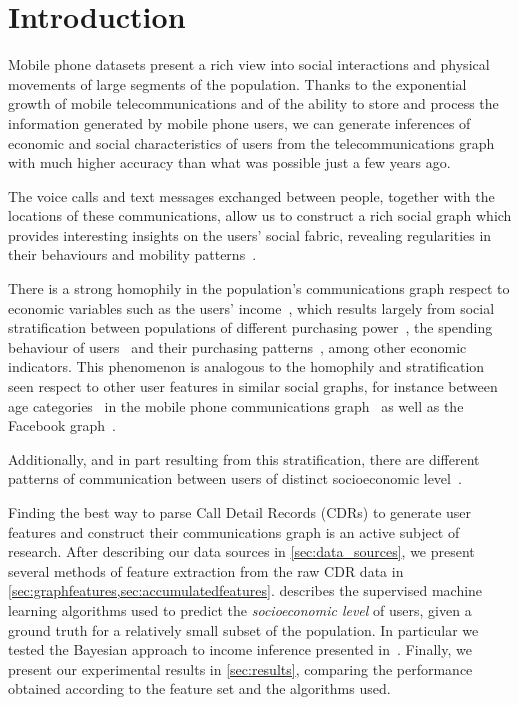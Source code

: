 
\section{Introduction}

Mobile phone datasets present a rich view into social interactions and physical movements of large segments of the population. Thanks to the exponential growth of mobile telecommunications and of the ability to store and process the information generated by mobile phone users, we can generate inferences of economic and social characteristics of users from the telecommunications graph with much higher accuracy than what was possible just a few years ago.

The voice calls and text messages exchanged between people, together with the locations of these communications, allow us to construct a rich social graph which provides interesting insights on the users' social fabric, revealing regularities in their behaviours and mobility patterns~\cite{gonzalez2008understanding,ponieman2013human,sarraute2015city}.

There is a strong homophily in the population's communications graph respect to economic variables such as the users' income~\cite{fixmanasonam2016}, which results largely from social stratification between populations of different purchasing power~\cite{leo2015socioeconomic}, the spending behaviour of users~\cite{singh2013predicting} and their purchasing patterns~\cite{Leo2016correlations}, among other economic indicators.
This phenomenon is analogous to the homophily and stratification seen respect to other user features in similar social graphs, for instance between age categories~\cite{mcpherson2001birds} in the mobile phone communications graph~\cite{sarraute2014} as well as the Facebook graph~\cite{ugander2011anatomy}.

Additionally, and in part resulting from this stratification, there are different patterns of communication between users of distinct socioeconomic level~\cite{Luo2017inferring}.

Finding the best way to parse Call Detail Records (CDRs) to generate user features and construct their communications graph is an active subject of research.  After describing our data sources in \cref{sec:data_sources}, we present several methods of feature extraction from the raw CDR data in \cref{sec:graphfeatures,sec:accumulatedfeatures}.  describes the supervised machine learning algorithms used to predict the \emph{socioeconomic level} of users, given a ground truth for a relatively small subset of the population. In particular we tested the Bayesian approach to income inference presented in~\cite{fixmanasonam2016}. Finally, we present our experimental results in \cref{sec:results}, comparing the performance obtained according to the feature set and the algorithms used.
